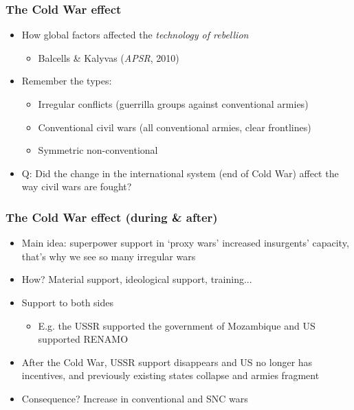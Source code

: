 \documentclass[aspectratio=43]{beamer}
\begin{document}
\begin{frame}
\frametitle{The Cold War effect}
\centering

\begin{itemize}
  \item<2-> How global factors affected the \textit{technology of rebellion}
  \begin{itemize}
    \item[] {\footnotesize Balcells \& Kalyvas (\textit{APSR}, 2010)}
  \end{itemize}
  \item<3-> Remember the types:
  \begin{itemize}
    \item Irregular conflicts (guerrilla groups against conventional armies)
    \item Conventional civil wars (all conventional armies, clear frontlines)
    \item Symmetric non-conventional
  \end{itemize}
  \item<3-> Q: Did the change in the international system (end of Cold War) affect the way civil wars are fought?
\end{itemize}

\end{frame}

\begin{frame}
\frametitle{The Cold War effect (during \& after)}
\centering

\begin{itemize}
  \item Main idea: superpower support in `proxy wars' increased insurgents' capacity, that's why we see so many irregular wars
  \item How? Material support, ideological support, training...
  \item Support to both sides
  \begin{itemize}
    \item E.g. the USSR supported the government of Mozambique and US supported RENAMO
  \end{itemize}
  \item<2-> After the Cold War, USSR support disappears and US no longer has incentives, and previously existing states collapse and armies fragment
  \item<2-> Consequence? Increase in conventional and SNC wars
\end{itemize}

\end{frame}
\end{document}
